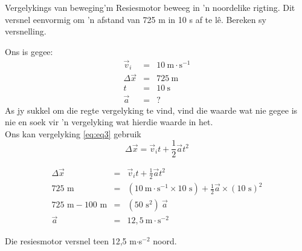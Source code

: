 \begin{wex}{Vergelykings van beweging}{'m Resiesmotor beweeg in 'n noordelike rigting. Dit versnel eenvormig om 'n afstand van 725 m in 10 s af te l\^e. Bereken sy versnelling.}
{
Ons is gegee:
\begin{eqnarray*}
\vec{v}_i&=&10\ \text{m} \cdot \text{s}^{-1}\\
\Delta \vec{x}&=&725\ \text{m}\\
t&=&10\ \text{s}\\
\vec{a}&=&?
\end{eqnarray*}
As jy sukkel om die regte vergelyking te vind, vind die waarde wat nie gegee is nie en soek vir 'n vergelyking wat hierdie waarde in het. \\
Ons kan vergelyking \ref{eq:eq3} gebruik
\begin{displaymath}
\Delta \vec{x}=\vec{v}_it +\frac{1}{2}\vec{a}t^2
\end{displaymath}

\begin{eqnarray*}
\Delta \vec{x} &=& \vec{v}_it +\frac{1}{2}\vec{a}t^2\\
725\text{~m} &=& (10~\text{m}\cdot \text{s}^{-1} \times 10\text{~s}) + \frac{1}{2} \vec{a} \times (10\text{~s})^2\\
725\text{~m} - 100\text{~m} &=& (50\text{~s}^2)~ \vec{a}\\
\vec{a} &=& 12,5~ \text{m} \cdot\text{s}^{-2}
\end{eqnarray*}

Die resiesmotor versnel teen 12,5 m$\cdot$s$^{-2}$ noord.}
\end{wex}

